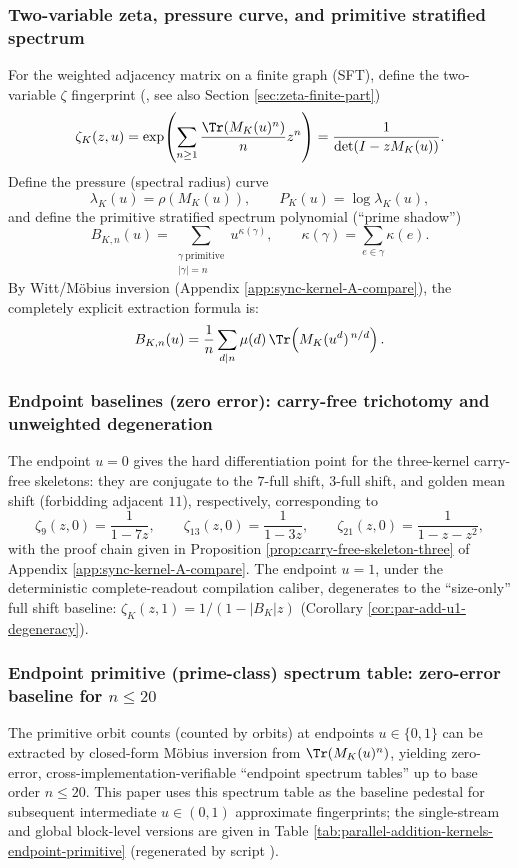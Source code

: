 \subsubsection{Two-variable zeta, pressure curve, and primitive stratified spectrum}
For the weighted adjacency matrix on a finite graph (SFT), define the two-variable $\zeta$ fingerprint (\cite{BrinStuck2002}, see also Section \ref{sec:zeta-finite-part})
\[
\zeta_K(z,u)
=\exp\!\left(\sum_{n\ge 1}\frac{\Tr(M_K(u)^n)}{n}z^n\right)
=\frac{1}{\det(I-zM_K(u))}.
\]
Define the pressure (spectral radius) curve
\[
\lambda_K(u)=\rho(M_K(u)),\qquad P_K(u)=\log\lambda_K(u),
\]
and define the primitive stratified spectrum polynomial (``prime shadow'')
\[
B_{K,n}(u)=\sum_{\substack{\gamma\ \mathrm{primitive}\\|\gamma|=n}}u^{\kappa(\gamma)},
\qquad \kappa(\gamma)=\sum_{e\in\gamma}\kappa(e).
\]
By Witt/M\"{o}bius inversion (Appendix \ref{app:sync-kernel-A-compare}), the completely explicit extraction formula is:
\[
B_{K,n}(u)=\frac{1}{n}\sum_{d\mid n}\mu(d)\,\Tr\!\left(M_K(u^d)^{\,n/d}\right).
\]

\subsubsection{Endpoint baselines (zero error): carry-free trichotomy and unweighted degeneration}
The endpoint $u=0$ gives the hard differentiation point for the three-kernel carry-free skeletons: they are conjugate to the $7$-full shift, $3$-full shift, and golden mean shift (forbidding adjacent $11$), respectively, corresponding to
\[
\zeta_9(z,0)=\frac{1}{1-7z},\qquad
\zeta_{13}(z,0)=\frac{1}{1-3z},\qquad
\zeta_{21}(z,0)=\frac{1}{1-z-z^2},
\]
with the proof chain given in Proposition \ref{prop:carry-free-skeleton-three} of Appendix \ref{app:sync-kernel-A-compare}.
The endpoint $u=1$, under the deterministic complete-readout compilation caliber, degenerates to the ``size-only'' full shift baseline: $\zeta_K(z,1)=1/(1-|B_K|z)$ (Corollary \ref{cor:par-add-u1-degeneracy}).

\subsubsection{Endpoint primitive (prime-class) spectrum table: zero-error baseline for \texorpdfstring{$n\le 20$}{n<=20}}
The primitive orbit counts (counted by orbits) at endpoints $u\in\{0,1\}$ can be extracted by closed-form M\"{o}bius inversion from $\Tr(M_K(u)^n)$, yielding zero-error, cross-implementation-verifiable ``endpoint spectrum tables'' up to base order $n\le 20$.
This paper uses this spectrum table as the baseline pedestal for subsequent intermediate $u\in(0,1)$ approximate fingerprints; the single-stream and global block-level versions are given in Table \ref{tab:parallel-addition-kernels-endpoint-primitive} (regenerated by script ).

